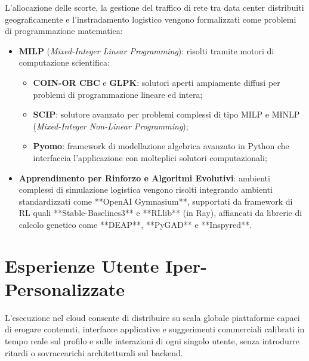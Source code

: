 \documentclass[11pt, a4paper]{article}
\begin{document}
L'allocazione delle scorte, la gestione del traffico di rete tra data center distribuiti geograficamente e l'instradamento logistico vengono formalizzati come problemi di programmazione matematica:
\begin{itemize}
    \item \textbf{MILP} (\emph{Mixed-Integer Linear Programming}): risolti tramite motori di computazione scientifica:
    \begin{itemize}
        \item \textbf{COIN-OR CBC} e \textbf{GLPK}: solutori aperti ampiamente diffusi per problemi di programmazione lineare ed intera;
        \item \textbf{SCIP}: solutore avanzato per problemi complessi di tipo MILP e MINLP (\emph{Mixed-Integer Non-Linear Programming});
        \item \textbf{Pyomo}: framework di modellazione algebrica avanzato in Python che interfaccia l'applicazione con molteplici solutori computazionali;
    \end{itemize}
    \item \textbf{Apprendimento per Rinforzo e Algoritmi Evolutivi}: ambienti complessi di simulazione logistica vengono risolti integrando ambienti standardizzati come **OpenAI Gymnasium**, supportati da framework di RL quali **Stable-Baselines3** e **RLlib** (in Ray), affiancati da librerie di calcolo genetico come **DEAP**, **PyGAD** e **Inspyred**.
\end{itemize}

\newpage


\section{Esperienze Utente Iper-Personalizzate}

L'esecuzione nel cloud consente di distribuire su scala globale piattaforme capaci di erogare contenuti, interfacce applicative e suggerimenti commerciali calibrati in tempo reale sul profilo e sulle interazioni di ogni singolo utente, senza introdurre ritardi o sovraccarichi architetturali sul backend.

\end{document}
